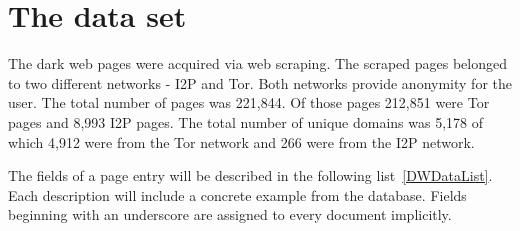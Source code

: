 \section{The data set} \label{dataSet}
The dark web pages were acquired via web scraping. The scraped pages belonged to two different networks - I2P  and Tor. Both networks provide anonymity for the user. The total number of pages was 221,844. Of those pages 212,851 were Tor pages and 8,993 I2P pages. The total number of unique domains was 5,178 of which 4,912 were from the Tor network and 266 were from the I2P network. 

The fields of a page entry will be described in the following list~\ref{DWDataList}. Each description will include a concrete example from the database. Fields beginning with an underscore are assigned to every document implicitly.
 \label{DWDataList}
